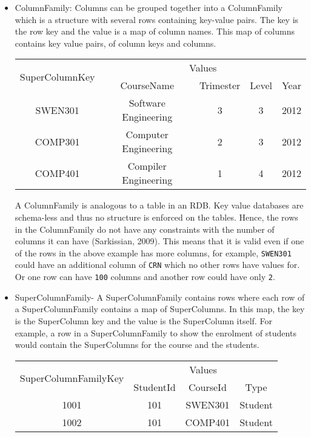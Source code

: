 \begin{itemize}
\item ColumnFamily: Columns can be grouped together into a ColumnFamily which is
a structure with several rows containing key-value pairs. The key is the row key
and the value is a map of column names. This map of columns contains key value
pairs, of column keys and columns.

\begin{table}[h]
	\centering
	\begin{tabular}{ c c c c c }
		\toprule
		\multirow{2}{*}{SuperColumnKey} & \multicolumn{4}{c}{Values}\\

		& CourseName & Trimester & Level & Year\\ 
		\midrule
		SWEN301 & Software Engineering & 3 & 3 & 2012\\
		COMP301 & Computer Engineering & 2 & 3 & 2012\\
		COMP401 & Compiler Engineering & 1 & 4 & 2012\\
		\bottomrule
	\end{tabular}
\end{table}
A ColumnFamily is analogous to a table in an \ac{RDB}. Key value databases are
schema-less and thus no structure is enforced on the tables. Hence, the rows in
the ColumnFamily do not have any constraints with the number of columns it can
have (Sarkissian, 2009). This means that it is valid even if one of the rows in
the above example has more columns, for example, \texttt{SWEN301} could have an
additional column of \texttt{CRN} which no other rows have values for. Or
one row can have \texttt{100} columns and another row could have only \texttt{2}.

\item SuperColumnFamily- A SuperColumnFamily contains rows where each row of a
SuperColumnFamily contains a map of SuperColumns. In this map, the key is the
SuperColumn key and the value is the SuperColumn itself. For example, a row in a
SuperColumnFamily to show the enrolment of students would contain the
SuperColumns for the course and the students.

\begin{table}[h]
	\centering
	\begin{tabular}{ c c c c }
		\toprule
		\multirow{2}{*}{SuperColumnFamilyKey} & \multicolumn{4}{c}{Values}\\
		& StudentId & CourseId & Type \\ 
		\midrule
		1001 & 101 & SWEN301 & Student \\
		1002 & 101 & COMP401 & Student \\
		\bottomrule
	\end{tabular}
\end{table}


\end{itemize}

